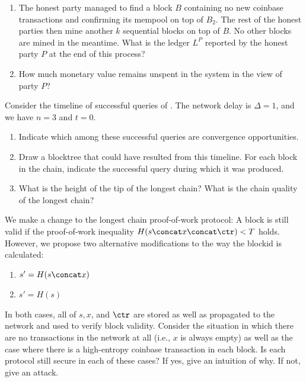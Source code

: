 \begin{problems}
\begin{enumerate}
                are mined. Which transactions will the mempool of this party
                contain?
          \item The honest party managed to find a block $B$ containing no new
                coinbase transactions and confirming its mempool on top of
                $B_2$. The rest of the honest parties then mine another $k$
                sequential blocks on top of $B$. No other blocks are mined in
                the meantime. What is the ledger $L^P$ reported by the honest
                party $P$ at the end of this process?
          \item How much monetary value remains unspent in the system in the
                view of party $P$?
        \end{enumerate}
  \item Consider the timeline of successful queries of . The
        network delay is $\Delta = 1$, and we have $n = 3$ and $t = 0$.
        \label{problem.timeline}
        \begin{enumerate}
          \item Indicate which among these successful queries are convergence
                opportunities.
          \item Draw a blocktree that could have resulted from this timeline.
                For each block in the chain, indicate the successful query
                during which it was produced.
          \item What is the height of the tip of the longest chain? What is the
                chain quality of the longest chain?
        \end{enumerate}
  \item We make a change to the longest chain proof-of-work protocol:
        A block is still valid if the proof-of-work inequality $H(s \concat x \concat \ctr) < T$
        holds. However, we propose two alternative modifications to the way the blockid is calculated:

        \begin{enumerate}
          \item $s' = H(s \concat x)$
          \item $s' = H(s)$
        \end{enumerate}

        In both cases, all of $s, x$, and $\ctr$ are stored as well as propagated to the network
        and used to verify block validity.
        Consider the situation in which there are no transactions in the network at all (i.e.,
        $x$ is always empty) as well as the case where there is a high-entropy coinbase transaction
        in each block.
        Is each protocol still secure in each of these cases?
        If yes, give an intuition of why. If not, give an attack.


\end{problems}
